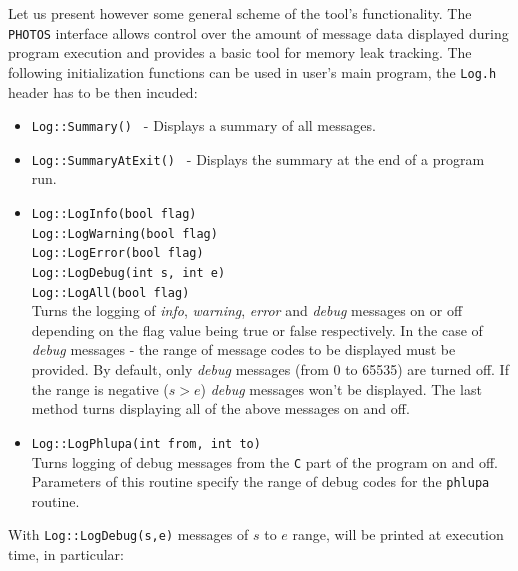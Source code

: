 \documentclass[]{Photos_interface_design}
\begin{document}
Let us present however some general scheme of the tool's
functionality.  The {\tt PHOTOS} interface allows control over the
amount of message data displayed during program execution and
provides a basic tool for memory leak tracking. The following initialization
functions can be used in user's main program, 
the  {\tt Log.h} header has to be then incuded:
\begin{itemize}
  \item {\tt Log::Summary() } - Displays a summary of all messages.
  \item {\tt Log::SummaryAtExit() } - Displays the summary at the end of a program run.
  \item {\tt Log::LogInfo(bool flag) } \\
        {\tt Log::LogWarning(bool flag) } \\
        {\tt Log::LogError(bool flag) } \\
        {\tt Log::LogDebug(int s, int e) } \\
        {\tt Log::LogAll(bool flag)} \\
        Turns the logging of \textit{info}, \textit{warning}, \textit{error} and \textit{debug} messages on or off depending
        on the flag value being true or false respectively. In the case of \textit{debug} messages - the range of message codes
        to be displayed must be provided. By default, only \textit{debug} messages
        (from 0 to 65535) are turned off. If the range is negative ($s>e$) \textit{debug} messages
        won't be displayed. The last method turns displaying all of the above messages on and off.
  \item {\tt Log::LogPhlupa(int from, int to) } \\
        Turns logging of debug messages from the {\tt C} part of the program on and off.
        Parameters of this routine specify the range of debug codes for the {\tt phlupa} routine.
\end{itemize}

With  {\tt Log::LogDebug(s,e)}  messages of $s$ to $e$ range, 
will be printed at execution time, in particular:
\end{document}
